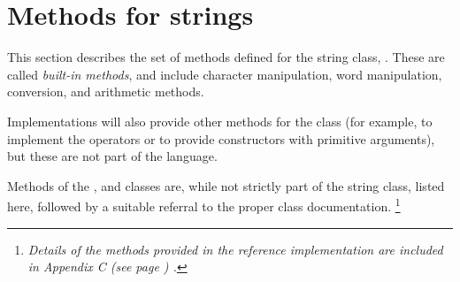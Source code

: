 \chapter{Methods for \nr{} strings}\label{refbmeth}
 This section describes the set of methods defined for the \nr{}
string class, .  These are called \emph{built-in
methods}, and include character manipulation, word manipulation,
conversion, and arithmetic methods.
 
Implementations will also provide other methods for the 
class (for example, to implement the \nr{} operators or to provide
constructors with primitive arguments), but these are not part of the
\nr{} language.

Methods of the ,  and
 classes are, while not strictly part of the
 string class, listed here, followed by a suitable
referral to the proper class documentation.
\footnote{
\emph{Details of the methods provided in the reference implementation are
included in  Appendix C (see page \pageref{refappc}) .}
}

